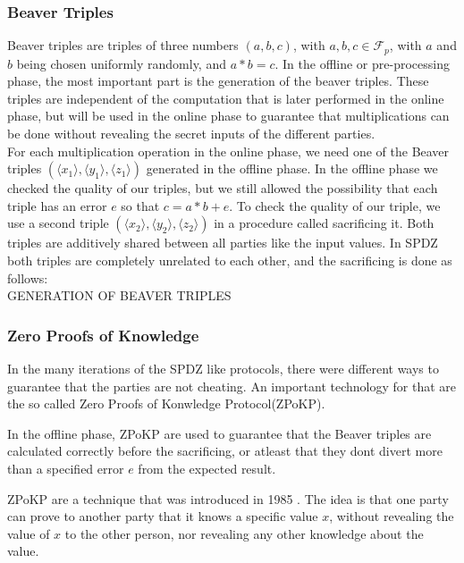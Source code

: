 \documentclass[english,runningheads,a4paper]{llncs}[2018/03/10]
\begin{document}
\subsubsection{Beaver Triples}

Beaver triples are triples of three numbers \((a,b,c)\), with \( a,b,c\in \mathcal{F}_p \), with \(a\) and \(b\) being chosen uniformly randomly, and \(a*b=c\).
In the offline or pre-processing phase, the most important part is the generation of the beaver triples. These triples  are independent of the computation that is later performed in the online phase, but will be used in the online phase to guarantee that multiplications can be done without revealing the secret inputs of the different parties.\\

For each multiplication operation in the online phase, we need one of the Beaver triples \( (\langle x_1 \rangle ,\langle y_1\rangle , \langle z_1\rangle )\) generated in the offline phase. In the offline phase we checked the quality of our triples, but we still allowed the possibility that each triple has an error \(e\) so that \(c=a*b+e\). To check the quality of our triple, we use a second triple \( (\langle x_2 \rangle ,\langle y_2\rangle ,\langle z_2\rangle )\) in a procedure called sacrificing it. Both triples are additively shared between all parties like the input values. In SPDZ both triples are completely unrelated to each other, and the sacrificing is done as follows:\\


GENERATION OF BEAVER TRIPLES







\subsubsection{Zero Proofs of Knowledge}
In the many iterations of the SPDZ like protocols, there were different ways to guarantee that the parties are not cheating. An important technology for that are the so called Zero Proofs of Konwledge Protocol(ZPoKP).

In the offline phase, ZPoKP are used to guarantee that the Beaver triples are calculated correctly before the sacrificing, or atleast that they dont divert more than a specified error \(e\) from the expected result.

ZPoKP are a technique that was introduced  in 1985 \cite{Goldwasser:1985:KCI:22145.22178}. The idea is that one party can prove to another party that it knows a specific value \(x\), without revealing the value of \(x\) to the other person, nor revealing any other knowledge about the value. 
\end{document}
